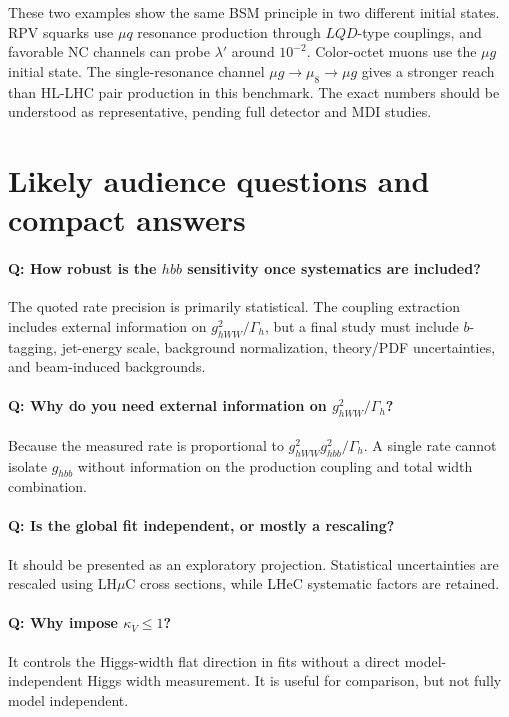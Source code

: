 \documentclass[11pt,a4paper]{article}
\newcommand{\LHmuC}{LH\ensuremath{\mu}C}
\begin{document}
These two examples show the same BSM principle in two different initial states.  RPV squarks use
\(\mu q\) resonance production through \(LQD\)-type couplings, and favorable NC channels can
probe \(\lambda'\) around \(10^{-2}\).  Color-octet muons use the \(\mu g\) initial state.  The
single-resonance channel \(\mu g\to\mu_8\to\mu g\) gives a stronger reach than HL-LHC pair
production in this benchmark.  The exact numbers should be understood as representative, pending
full detector and MDI studies.

\section{Likely audience questions and compact answers}

\paragraph{Q: How robust is the \(hbb\) sensitivity once systematics are included?}
The quoted rate precision is primarily statistical.  The coupling extraction includes external
information on \(g_{hWW}^2/\Gamma_h\), but a final study must include \(b\)-tagging, jet-energy
scale, background normalization, theory/PDF uncertainties, and beam-induced backgrounds.

\paragraph{Q: Why do you need external information on \(g_{hWW}^2/\Gamma_h\)?}
Because the measured rate is proportional to \(g_{hWW}^2g_{hbb}^2/\Gamma_h\).  A single rate
cannot isolate \(g_{hbb}\) without information on the production coupling and total width
combination.

\paragraph{Q: Is the global fit independent, or mostly a rescaling?}
It should be presented as an exploratory projection.  Statistical uncertainties are rescaled using
\LHmuC{} cross sections, while LHeC systematic factors are retained.

\paragraph{Q: Why impose \(\kappa_V\le1\)?}
It controls the Higgs-width flat direction in fits without a direct model-independent Higgs width
measurement.  It is useful for comparison, but not fully model independent.
\end{document}
